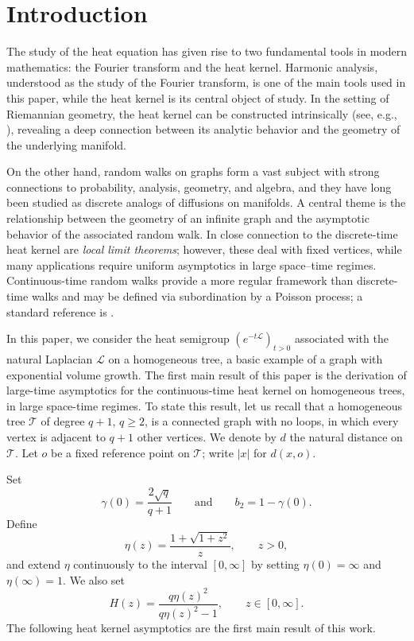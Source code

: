 \documentclass[11pt,a4paper,reqno]{amsart}
\renewcommand\mathcal{\mathscr}
\theoremstyle{plain}
\theoremstyle{remark}
\theoremstyle{definition}
\theoremstyle{remark}
\numberwithin{equation}{section}
\begin{document}
\section{Introduction}

The study of the heat equation has given rise to two fundamental tools in modern mathematics: the Fourier transform and the heat kernel. Harmonic analysis, understood as the study of the Fourier transform, is one of the main tools used in this paper, while the heat kernel is its central object of study. In the setting of Riemannian geometry, the heat kernel can be constructed intrinsically (see, e.g., \cite{Gri}), revealing a deep connection between its analytic behavior and the geometry of the underlying manifold.

On the other hand, random walks on graphs form a vast subject with strong connections to probability, analysis, geometry, and algebra, and they have long been studied as discrete analogs of diffusions on manifolds. A central theme is the relationship between the geometry of an infinite graph and the asymptotic behavior of the associated random walk. In close connection to the discrete-time heat kernel are \textit{local limit theorems}; however, these deal with fixed vertices, while many applications require uniform asymptotics in large space--time regimes.  
Continuous-time random walks provide a more regular framework than discrete-time walks and may be defined via subordination by a Poisson process; a standard reference is \cite[Section 5]{Barlow}.

 In this paper, we consider the heat semigroup $(e^{-t\mathcal{L}})_{t> 0}$ associated with the natural Laplacian $\mathcal{L}$ on a homogeneous tree, a basic example of a graph with exponential volume growth. 
The first main result of this paper is the derivation of large-time asymptotics for the continuous-time heat kernel on homogeneous trees, in large space-time regimes. To state this result, let us recall that a homogeneous tree $\mathcal{T}$ of degree $q + 1$, $q\geq 2$, is a connected graph with no loops, in which every vertex is adjacent to $q + 1$ other vertices. We denote by $d$ the natural distance on $\mathcal{T}$. Let $o$ be a fixed reference point on $\mathcal{T}$; write $|x|$ for $d(x,o)$. 


Set
\[
\gamma(0)=\frac{2\sqrt q}{q+1}
\qquad\text{and}\qquad
b_2=1-\gamma(0).
\]
Define
\begin{equation}\label{eq:def_eta}
\eta(z)=\frac{1+\sqrt{1+z^2}}{z},
\qquad z>0,
\end{equation}
and extend $\eta$ continuously to the interval
$[0,\infty]$ by setting $\eta(0)=\infty$ and $\eta(\infty)=1$.
We also set
\[
H(z)=\frac{q\eta(z)^2}{q\eta(z)^2-1},
\qquad z\in[0,\infty].
\]
The following heat kernel asymptotics are the first main result of this work.
\end{document}
